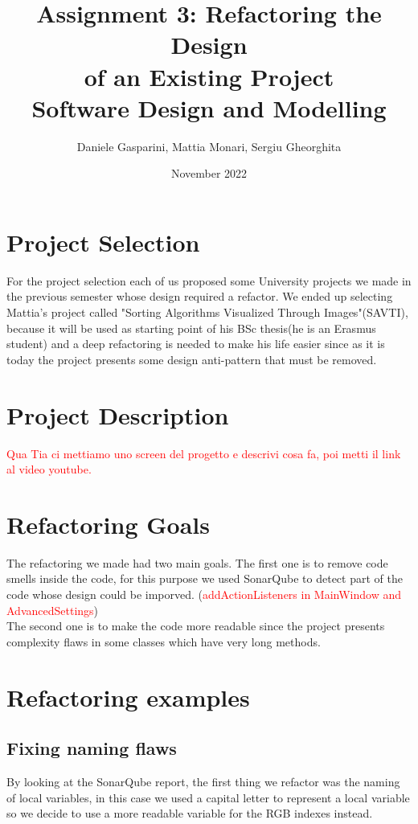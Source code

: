 \documentclass{article}
\title{Assignment 3: Refactoring the Design\\
of an Existing Project\\
\large Software Design and Modelling}
\author{Daniele Gasparini, Mattia Monari, Sergiu Gheorghita}
\date{\nth{25} November 2022}
\begin{document}
\maketitle

\section{Project Selection}
For the project selection each of us proposed some University projects we made in the previous semester whose design required a refactor. We ended up selecting Mattia's project called "Sorting Algorithms Visualized Through Images"(SAVTI), because it will be used as starting point of his BSc thesis(he is an Erasmus student) and a deep refactoring is needed to make his life easier since as it is today the project presents some design anti-pattern that must be removed.

\section{Project Description}
\textcolor{red}{Qua Tia ci mettiamo uno screen del progetto e descrivi cosa fa, poi metti il link al video youtube.}
\section{Refactoring Goals}
The refactoring we made had two main goals. The first one is to remove code smells inside the code, for this purpose we used SonarQube to detect part of the code whose design could be imporved. 
(\textcolor{red}{addActionListeners in MainWindow and AdvancedSettings})\\
The second one is to make the code more readable since the project presents complexity flaws in some classes which have very long methods.

\section{Refactoring examples}

\subsection{Fixing naming flaws}
By looking at the SonarQube report, the first thing we refactor was the naming of local variables, in this case we used a capital letter to represent a local variable so we decide to use a more readable variable for the RGB indexes instead.
\end{document}
